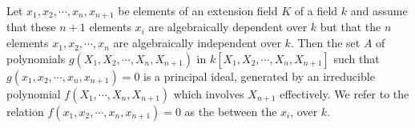 Let $x_1, x_2, \cdots, x_n, x_{n+1}$ be elements of an extension field $K$ of a field $k$ and assume that these $n+1$ elements $x_i$ are algebraically dependent over $k$ but that the $n$ elements $x_1, x_2, \cdots, x_n$ are algebraically independent over $k$. Then the set $A$ of polynomials $g(X_1, X_2, \cdots, X_n, X_{n+1})$ in $k[X_1, X_2, \cdots, X_n, X_{n+1}]$ such that $g(x_1, x_2, \cdots, x_n, x_{n+1}) = 0$ is a principal ideal, generated by an irreducible polynomial $f(X_1, \cdots, X_n, X_{n+1})$ which involves $X_{n+1}$ effectively. We refer to the relation $f(x_1, x_2, \cdots, x_n, x_{n+1}) = 0$ as the  between the $x_i$, over $k$.
